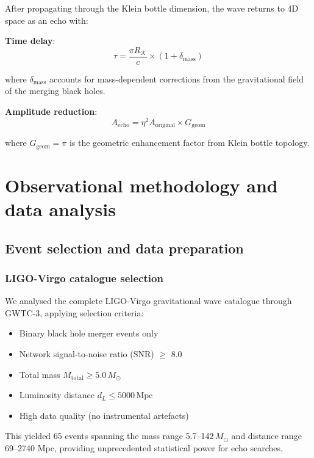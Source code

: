 \documentclass[12pt]{iopart}
\newcommand{\Msun}{\,M_{\odot}}
\newcommand{\Mpc}{\,\mathrm{Mpc}}
\newcommand{\Klein}{\mathcal{K}}
\newcommand{\KleinRadius}{R_\Klein}
\begin{document}
After propagating through the Klein bottle dimension, the wave returns to 4D space as an echo with:

\textbf{Time delay}:
\begin{equation}
\tau = \frac{\pi \KleinRadius}{c} \times \left(1 + \delta_{\mathrm{mass}}\right)
\label{eq:echo_timing}
\end{equation}

where $\delta_{\mathrm{mass}}$ accounts for mass-dependent corrections from the gravitational field of the merging black holes.

\textbf{Amplitude reduction}:
\begin{equation}
A_{\mathrm{echo}} = \eta^2 A_{\mathrm{original}} \times G_{\mathrm{geom}}
\label{eq:echo_amplitude}
\end{equation}

where $G_{\mathrm{geom}} = \pi$ is the geometric enhancement factor from Klein bottle topology.

\section{Observational methodology and data analysis}

\subsection{Event selection and data preparation}

\subsubsection{LIGO-Virgo catalogue selection}

We analysed the complete LIGO-Virgo gravitational wave catalogue through GWTC-3, applying selection criteria:

\begin{itemize}
\item Binary black hole merger events only
\item Network signal-to-noise ratio (SNR) $\geq$ 8.0
\item Total mass $M_{\mathrm{total}} \geq 5.0\Msun$
\item Luminosity distance $d_L \leq 5000\Mpc$
\item High data quality (no instrumental artefacts)
\end{itemize}

This yielded 65 events spanning the mass range 5.7--142$\Msun$ and distance range 69--2740 Mpc, providing unprecedented statistical power for echo searches.
\end{document}
